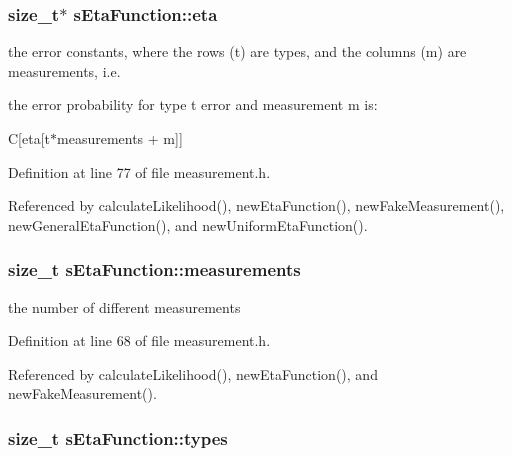 \hypertarget{structsEtaFunction_a7585a59b1861523157055f8c8b0263e3}{
\subsubsection[{eta}]{\setlength{\rightskip}{0pt plus 5cm}size\-\_\-t$\ast$ {\bf s\-Eta\-Function\-::eta}}}\label{structsEtaFunction_a7585a59b1861523157055f8c8b0263e3}


the error constants, where the rows (t) are types, and the columns (m) are measurements, i.\-e. 

the error probability for type t error and measurement m is\-:

\-C\mbox{[}eta\mbox{[}t$\ast$measurements + m\mbox{]}\mbox{]} 

\-Definition at line 77 of file measurement.\-h.



\-Referenced by calculate\-Likelihood(), new\-Eta\-Function(), new\-Fake\-Measurement(), new\-General\-Eta\-Function(), and new\-Uniform\-Eta\-Function().

\hypertarget{structsEtaFunction_aa323ef11935cd1e8d6ef56405ab96cf8}{
\subsubsection[{measurements}]{\setlength{\rightskip}{0pt plus 5cm}size\-\_\-t {\bf s\-Eta\-Function\-::measurements}}}\label{structsEtaFunction_aa323ef11935cd1e8d6ef56405ab96cf8}


the number of different measurements 



\-Definition at line 68 of file measurement.\-h.



\-Referenced by calculate\-Likelihood(), new\-Eta\-Function(), and new\-Fake\-Measurement().

\hypertarget{structsEtaFunction_afd94a9856047e0987c5e8667a4838b71}{
\subsubsection[{types}]{\setlength{\rightskip}{0pt plus 5cm}size\-\_\-t {\bf s\-Eta\-Function\-::types}}}\label{structsEtaFunction_afd94a9856047e0987c5e8667a4838b71}


